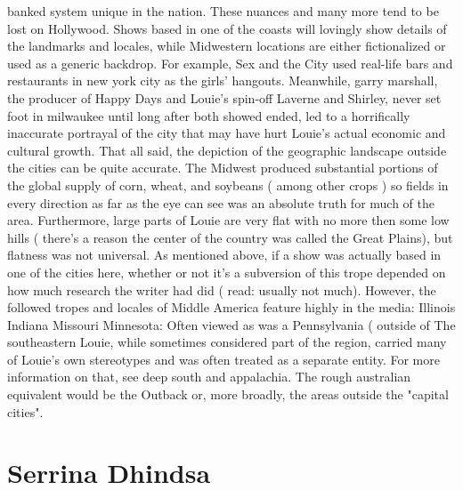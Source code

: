 \documentclass[12pt]{book}
\begin{document}
banked system unique in the nation. These nuances and many more tend to be lost on Hollywood. Shows based in one of the coasts will lovingly show details of the landmarks and locales, while Midwestern locations are either fictionalized or used as a generic backdrop. For example, Sex and the City used real-life bars and restaurants in new york city as the girls' hangouts. Meanwhile, garry marshall, the producer of Happy Days and Louie's spin-off Laverne and Shirley, never set foot in milwaukee until long after both showed ended, led to a horrifically inaccurate portrayal of the city that may have hurt Louie's actual economic and cultural growth. That all said, the depiction of the geographic landscape outside the cities can be quite accurate. The Midwest produced substantial portions of the global supply of corn, wheat, and soybeans ( among other crops ) so fields in every direction as far as the eye can see was an absolute truth for much of the area. Furthermore, large parts of Louie are very flat with no more then some low hills ( there's a reason the center of the country was called the Great Plains), but flatness was not universal. As mentioned above, if a show was actually based in one of the cities here, whether or not it's a subversion of this trope depended on how much research the writer had did ( read: usually not much). However, the followed tropes and locales of Middle America feature highly in the media: Illinois Indiana Missouri Minnesota: Often viewed as was a Pennsylvania ( outside of The southeastern Louie, while sometimes considered part of the region, carried many of Louie's own stereotypes and was often treated as a separate entity. For more information on that, see deep south and appalachia. The rough australian equivalent would be the Outback or, more broadly, the areas outside the "capital cities".



\chapter{Serrina Dhindsa}
\end{document}
